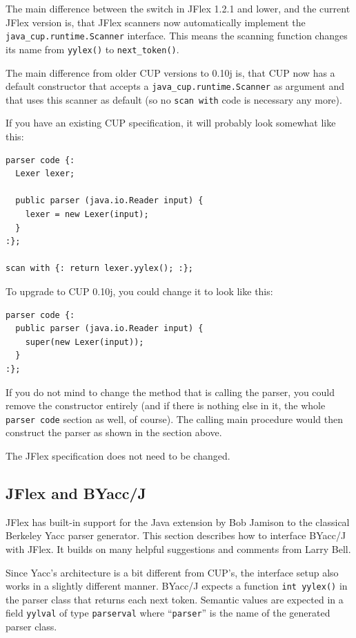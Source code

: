 \documentclass[11pt]{scrartcl}
\newcommand{\xsmall}{\small}
\begin{document}
The main difference between the \texttt{} switch in
JFlex 1.2.1 and lower, and the current JFlex version is, that JFlex scanners
now automatically implement the \texttt{java\_cup.runtime.Scanner} interface.
This means the scanning function changes its name from \texttt{yylex()}
to \texttt{next\_token()}. 

The main difference from older CUP versions to 0.10j is, that CUP now
has a default constructor that accepts a \texttt{java\_cup.runtime.Scanner} 
as argument and that uses this scanner as
default (so no \texttt{scan with} code is necessary any more).

If you have an existing CUP specification, it will probably look somewhat like this:
{\xsmall\begin{verbatim}
parser code {:
  Lexer lexer;

  public parser (java.io.Reader input) {
    lexer = new Lexer(input);
  }
:};

scan with {: return lexer.yylex(); :};
\end{verbatim}
}

To upgrade to CUP 0.10j, you could change it to look like this:
{\xsmall\begin{verbatim}
parser code {:
  public parser (java.io.Reader input) {
    super(new Lexer(input));
  }
:};
\end{verbatim}
}

If you do not mind to change the method that is calling the parser,
you could remove the constructor entirely (and if there is nothing else
in it, the whole \texttt{parser code} section as well, of course). The calling
main procedure would then construct the parser as shown in the section above.

The JFlex specification does not need to be changed.


\subsection{JFlex and BYacc/J\label{YaccWork}}

JFlex has built-in support for the Java extension 
\cite{BYaccJ} by Bob Jamison
to the classical Berkeley Yacc parser generator.
This section describes how to interface BYacc/J with JFlex. It
builds on many helpful suggestions and comments from Larry Bell.

Since Yacc's architecture is a bit different from CUP's, the
interface setup also works in a slightly different manner.
BYacc/J expects a function \texttt{int yylex()} in the parser
class that returns each next token. Semantic values are expected
in a field \texttt{yylval} of type \texttt{parserval} where ``\texttt{parser}''
is the name of the generated parser class.
\end{document}
